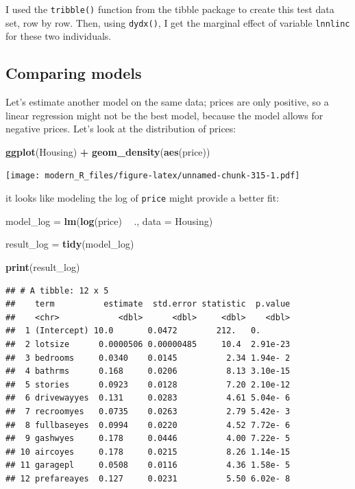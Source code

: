 \documentclass[]{gitbook}
\newenvironment{Shaded}{\begin{snugshade}}{\end{snugshade}}
\newcommand{\DataTypeTok}[1]{\textcolor[rgb]{0.13,0.29,0.53}{#1}}
\newcommand{\KeywordTok}[1]{\textcolor[rgb]{0.13,0.29,0.53}{\textbf{#1}}}
\newcommand{\NormalTok}[1]{#1}
\newcommand{\OperatorTok}[1]{\textcolor[rgb]{0.81,0.36,0.00}{\textbf{#1}}}
\newcommand{\StringTok}[1]{\textcolor[rgb]{0.31,0.60,0.02}{#1}}
\theoremstyle{definition}
\theoremstyle{definition}
\theoremstyle{definition}
\theoremstyle{remark}
\begin{document}
I used the \texttt{tribble()} function from the tibble package to create
this test data set, row by row. Then, using \texttt{dydx()}, I get the
marginal effect of variable \texttt{lnnlinc} for these two individuals.

\hypertarget{comparing-models}{%
\subsection{Comparing models}\label{comparing-models}}

Let's estimate another model on the same data; prices are only positive,
so a linear regression might not be the best model, because the model
allows for negative prices. Let's look at the distribution of prices:

\begin{Shaded}
\begin{Highlighting}[]
\KeywordTok{ggplot}\NormalTok{(Housing) }\OperatorTok{+}
\StringTok{  }\KeywordTok{geom_density}\NormalTok{(}\KeywordTok{aes}\NormalTok{(price))}
\end{Highlighting}
\end{Shaded}

\texttt{[image: modern\_R\_files/figure-latex/unnamed-chunk-315-1.pdf]}

it looks like modeling the log of \texttt{price} might provide a better
fit:

\begin{Shaded}
\begin{Highlighting}[]
\NormalTok{model_log =}\StringTok{ }\KeywordTok{lm}\NormalTok{(}\KeywordTok{log}\NormalTok{(price) }\OperatorTok{~}\StringTok{ }\NormalTok{., }\DataTypeTok{data =}\NormalTok{ Housing)}

\NormalTok{result_log =}\StringTok{ }\KeywordTok{tidy}\NormalTok{(model_log)}

\KeywordTok{print}\NormalTok{(result_log)}
\end{Highlighting}
\end{Shaded}

\begin{verbatim}
## # A tibble: 12 x 5
##    term          estimate  std.error statistic  p.value
##    <chr>            <dbl>      <dbl>     <dbl>    <dbl>
##  1 (Intercept) 10.0       0.0472        212.   0.      
##  2 lotsize      0.0000506 0.00000485     10.4  2.91e-23
##  3 bedrooms     0.0340    0.0145          2.34 1.94e- 2
##  4 bathrms      0.168     0.0206          8.13 3.10e-15
##  5 stories      0.0923    0.0128          7.20 2.10e-12
##  6 drivewayyes  0.131     0.0283          4.61 5.04e- 6
##  7 recroomyes   0.0735    0.0263          2.79 5.42e- 3
##  8 fullbaseyes  0.0994    0.0220          4.52 7.72e- 6
##  9 gashwyes     0.178     0.0446          4.00 7.22e- 5
## 10 aircoyes     0.178     0.0215          8.26 1.14e-15
## 11 garagepl     0.0508    0.0116          4.36 1.58e- 5
## 12 prefareayes  0.127     0.0231          5.50 6.02e- 8
\end{verbatim}
\end{document}
